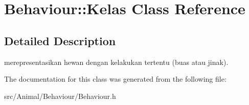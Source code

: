\hypertarget{classBehaviour_1_1Kelas}{\section{Behaviour\+:\+:Kelas Class Reference}
\label{classBehaviour_1_1Kelas}
}


\subsection{Detailed Description}
merepresentasikan hewan dengan kelakukan tertentu (buas atau jinak). 

The documentation for this class was generated from the following file\+:\begin{DoxyCompactItemize}
\item 
src/\+Animal/\+Behaviour/Behaviour.\+h\end{DoxyCompactItemize}
